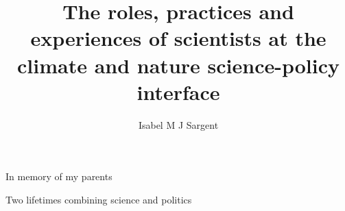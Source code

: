 
\makeatletter
\setlength{\@fptop}{0pt}
\setlength{\@fpbot}{0pt plus 1fil}
\makeatother

\title{The roles, practices and experiences of scientists at the climate and nature science-policy interface}
\author{Isabel M J Sargent}
\raggedbottom
\maketitle

\newpage
\thispagestyle{plain}
In memory of my parents

Two lifetimes combining science and politics
\makedeclaration

